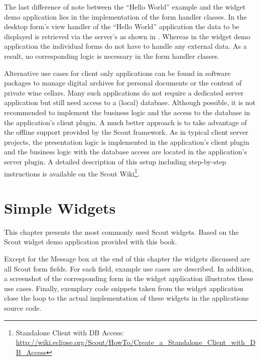 \documentclass[a4paper,10pt,twoside]{book}
\begin{document}
{The last difference of note between the ``Hello World'' example and the widget demo application lies in the implementation of the form handler classes. 
In the desktop form's view handler of the ``Hello World'' application the data to be displayed is retrieved via the server's  as shown in . 
Whereas in the widget demo application the individual forms do not have to handle any external data. 
As a result, no corresponding logic is necessary in the form handler classes.

Alternative use cases for client only applications can be found in software packages to manage digital archives for personal documents or the content of private wine cellars. 
Many such applications do not require a dedicated server application but still need access to a (local) database. 
Although possible, it is not recommended to implement the business logic and the access to the database in the application's client plugin. 
A much better approach is to take advantage of the offline support provided by the Scout framework. 
As in typical client server projects, the presentation logic is implemented in the application's client plugin and the business logic with the database access are located in the application's server plugin. 
A detailed description of this setup including step-by-step instructions is available on the Scout Wiki\footnote{
Standalone Client with DB Access: \url{http://wiki.eclipse.org/Scout/HowTo/Create_a_Standalone_Client_with_DB_Access}
}.

\chapter{Simple Widgets}

This chapter presents the most commonly used Scout widgets.
Based on the Scout widget demo application provided with this book.
 
Except for the Message box at the end of this chapter the widgets discussed are all Scout form fields. 
For each field, example use cases are described. 
In addition, a screenshot of the corresponding form in the widget application illustrates these use cases.
Finally, exemplary code snippets taken from the widget application close the loop to the actual implementation of these widgets in the applications source code.


}
\end{document}
